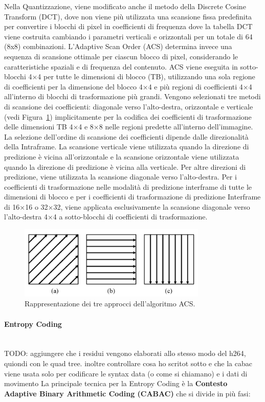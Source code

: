 \documentclass[a4paper,12pt, oneside]{article}
\begin{document}
Nella Quantizzazione, viene modificato anche il metodo della Discrete Cosine Transform (DCT), dove non viene
più utilizzata una scansione fissa predefinita per convertire i blocchi di pixel in coefficienti di frequenza
dove la tabella DCT viene costruita cambiando i parametri verticali e orizzontali per un totale di 64 (8x8)
combinazioni.
L'Adaptive Scan Order (ACS) determina invece una sequenza di scansione ottimale per ciascun blocco di pixel,
considerando le caratteristiche spaziali e di frequenza del contenuto. ACS viene eseguita in sotto-blocchi
4×4 per tutte le dimensioni di blocco (TB), utilizzando una sola regione di coefficienti per la dimensione
del blocco 4×4 e più regioni di coefficienti 4×4 all'interno di blocchi di trasformazione più grandi. Vengono
selezionati tre metodi di scansione dei coefficienti: diagonale verso l'alto-destra, orizzontale e verticale
(vedi Figura~\ref{fig:HEVC_ACS}) implicitamente per la codifica dei coefficienti di trasformazione delle
dimensioni TB 4×4 e 8×8 nelle regioni predette all'interno dell'immagine. La selezione dell'ordine di
scansione dei coefficienti dipende dalle direzionalità della Intraframe. La scansione verticale viene
utilizzata quando la direzione di predizione è vicina all'orizzontale e la scansione orizzontale viene
utilizzata quando la direzione di predizione è vicina alla verticale. Per altre direzioni di predizione,
viene utilizzata la scansione diagonale verso l'alto-destra. Per i coefficienti di trasformazione nelle
modalità di predizione interframe di tutte le dimensioni di blocco e per i coefficienti di trasformazione
di predizione Interframe di 16×16 o 32×32, viene applicata esclusivamente la scansione diagonale verso
l'alto-destra 4×4 a sotto-blocchi di coefficienti di trasformazione.

\begin{figure}[h]
    \centering
    \includegraphics[width=0.8\textwidth]{images/HEVC-ACS.png}
    \caption{Rappresentazione dei tre approcci dell'algoritmo ACS.}
    \label{fig:HEVC_ACS}
\end{figure}

\paragraph{Entropy Coding}\hphantom{A}\\
TODO: aggiungere che i residui vengono elaborati allo stesso modo del h264, quiondi con le quad tree. inoltre controllare cosa ho scritot sotto e che la cabac viene usata solo per codificare le syntax data (o come si chiamano) e i dati di movimento
La principale tecnica per la Entropy Coding è la \textbf{Contesto Adaptive Binary Arithmetic Coding (CABAC)} che si divide in più fasi:
\end{document}
